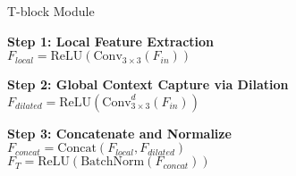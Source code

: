 \begin{algorithm}
\caption{T-block Module}

\textbf{Step 1: Local Feature Extraction} \\
$F_{local} = \text{ReLU}(\text{Conv}_{3\times3}(F_{in}))$

\textbf{Step 2: Global Context Capture via Dilation} \\
$F_{dilated} = \text{ReLU}(\text{Conv}_{3\times3}^{d}(F_{in}))$

\textbf{Step 3: Concatenate and Normalize} \\
$F_{concat} = \text{Concat}(F_{local}, F_{dilated})$ \\
$F_T = \text{ReLU}(\text{BatchNorm}(F_{concat}))$

\end{algorithm}
